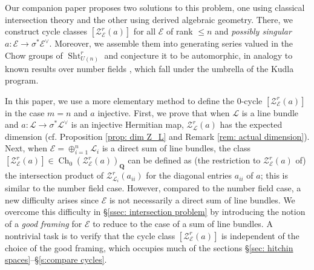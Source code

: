 \documentclass[reqno]{amsart}
\numberwithin{equation}{section}
\newcommand{\Q}{\mathbf{Q}}
\newcommand{\Cal}[1]{\mathcal{#1}}
\newcommand{\co}{\colon}
\DeclareMathOperator{\Sht}{Sht}
\DeclareMathOperator{\Ch}{Ch}
\newcommand\cE{\mathcal{E}}
\newcommand\cL{\mathcal{L}}
\newcommand\cZ{\mathcal{Z}}
\theoremstyle{remark}
\numberwithin{equation}{section}
\begin{document}
Our companion paper \cite{FYZ2} proposes two solutions to this problem, one using classical intersection theory and the other using derived algebraic geometry. There, we construct cycle classes $[\cZ^{r}_{\cE}(a)]$ for all $\cE$ of rank $\le n$ and \emph{possibly singular} $a \co \cE \rightarrow \sigma^* \cE^{\vee}$. Moreover,  we assemble them into generating series valued in the Chow groups of $\Sht_{U(n)}^r$ and conjecture it to be automorphic, in analogy to known results over number fields \cite{BHKRY1}, which fall under the umbrella of the Kudla program. 


In this paper, we use a more elementary method to define the $0$-cycle $[\Cal{Z}_{\cE}^r(a)]$ in the case $m=n$ and $a$ injective. First, we prove that when $\cL$ is a line bundle and $a \co \cL \rightarrow \sigma^* \cL^{\vee}$ is an injective Hermitian map, $\Cal{Z}_{\cL}^r(a)$ has the expected dimension (cf. Proposition \ref{prop: dim Z_L} and Remark \ref{rem: actual dimension}). Next, when $\cE=\oplus_{i=1}^n \cL_i$ is a direct sum of line bundles, the class $[\Cal{Z}_{\cE}^r(a) ] \in \Ch_0(\Cal{Z}_{\cE}^r(a))_{\Q}$ can be defined as (the restriction to $\Cal{Z}_{\cE}^r(a)$ of) the intersection product of $\Cal{Z}_{\cL_i}^r(a_{ii})$ for the diagonal entries $a_{ii}$ of $a$; this is similar to the number field case.  However, compared to the number field case, a new difficulty arises since $\cE$ is not necessarily a direct sum of line bundles. We overcome this difficulty in \S\ref{ssec: intersection problem} by introducing the notion of a \emph{good framing} for $\cE$ to reduce to the case of a sum of line bundles. A nontrivial task is to verify that the cycle class $[\Cal{Z}_{\cE}^r(a) ]$ is independent of the choice of the good framing, which occupies much of the sections \S\ref{sec: hitchin spaces}--\S\ref{s:compare cycles}.




%
\end{document}
